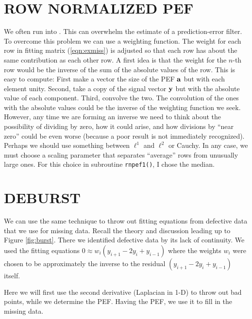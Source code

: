 \section{ROW NORMALIZED PEF}
We often run into .
This can overwhelm the estimate of a prediction-error filter.
To overcome this problem we can use a weighting function.
The weight for each row in fitting matrix
(\ref{eqn:exmiss})
is adjusted so that each row has about the same
contribution as each other row.
A first idea is that the weight for the $n$-th row
would be the inverse of the sum of the absolute values of the row.
This is easy to compute:
First make a vector the size of the PEF $\bold a$ but with each element unity.
Second, take a copy of the signal vector $\bold y$
but with the absolute value of each component.
Third, convolve the two.
%
\noindent
The convolution of the ones with the absolute values
could be the inverse of the weighting function we seek.
However, any time we are forming an inverse we need to think
about the possibility of dividing by zero, how it could arise,
and how divisions by ``near zero'' could be even worse
(because a poor result is not immediately recognized).
Perhaps we should use something between $\ell^1$ and $\ell^2$ or Cauchy.
In any case, we must choose a scaling parameter
that separates ``average'' rows from unusually large ones.
For this choice in subroutine \texttt{rnpef1()}, I chose the median.


\section{DEBURST}
\par
We can use the same technique to throw out fitting equations
from defective data that we use for missing data.
Recall the theory and discussion leading up to 
Figure \ref{fig:burst}.
There we identified defective data by its lack
of continuity.  We used the fitting equations
$0\approx w_i (y_{i+1} -2y_i + y_{i-1})$
where the weights $w_i$ were chosen
to be approximately the inverse
to the residual $(y_{i+1} -2y_i + y_{i-1})$ itself.
\par
Here we will first use the second derivative
(Laplacian in 1-D) to throw out bad points,
while we determine the PEF.
Having the PEF, we use it to fill in the missing data.

